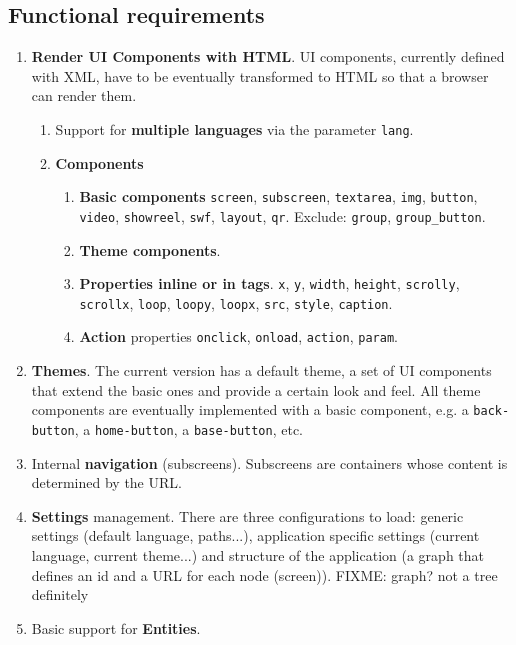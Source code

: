 \subsection*{Functional requirements}
\begin{enumerate}
    \item \textbf{Render \ac{UI} Components with \ac{HTML}}. \ac{UI} components, currently defined with \ac{XML}, have to be eventually transformed to \ac{HTML} so that a browser can render them.
    \begin{enumerate}
        \item Support for \textbf{multiple languages} via the parameter \texttt{lang}.
        \item \textbf{Components} 
        \begin{enumerate}
            \item \textbf{Basic components} \texttt{screen}, \texttt{subscreen}, \texttt{textarea}, \texttt{img}, \texttt{button}, \texttt{video}, \texttt{showreel}, \texttt{swf}, \texttt{layout}, \texttt{qr}.  Exclude: \texttt{group}, \texttt{group\_button}.
            \item \textbf{Theme components}.
            \item \textbf{Properties inline or in tags}. \texttt{x}, \texttt{y}, \texttt{width}, \texttt{height}, \texttt{scrolly}, \texttt{scrollx}, \texttt{loop}, \texttt{loopy}, \texttt{loopx}, \texttt{src}, \texttt{style}, \texttt{caption}.
            \item \textbf{Action} properties \texttt{onclick}, \texttt{onload}, \texttt{action}, \texttt{param}.
        \end{enumerate}
        
    \end{enumerate}
    \item \textbf{Themes}. The current version has a default theme, a set of \ac{UI} components that extend the basic ones and provide a certain look and feel. All theme components are eventually implemented with a basic component, e.g. a \texttt{back-button}, a \texttt{home-button}, a \texttt{base-button}, etc.
    \item Internal \textbf{navigation} (subscreens). Subscreens are containers whose content is determined by the \ac{URL}.
    \item \textbf{Settings} management. There are three configurations to load: generic settings (default language, paths...), application specific settings (current language, current theme...) and structure of the application (a graph that defines an id and a \ac{URL} for each node (screen)). FIXME: graph? not a tree definitely
    \item Basic support for \textbf{Entities}.
\end{enumerate}

